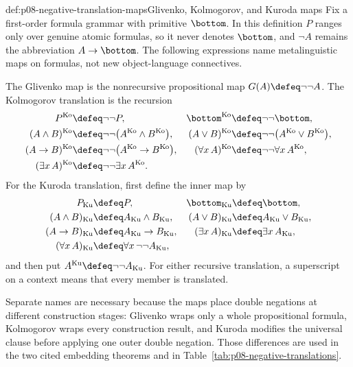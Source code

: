 \begin{hbdefinition}{def:p08-negative-translation-maps}{Glivenko, Kolmogorov, and Kuroda maps}
Fix a first-order formula grammar with primitive \(\bottom\).  In this
definition \(P\) ranges only over genuine atomic formulas, so it never denotes
\(\bottom\), and \(\neg A\) remains the abbreviation
\(A\to\bottom\).  The following expressions name metalinguistic maps on
formulas, not new object-language connectives.

The Glivenko map is the nonrecursive propositional map
\(G(A)\defeq\neg\neg A\).  The Kolmogorov translation is the recursion
\[
 \begin{aligned}
 P^{\mathrm{Ko}}&\defeq\neg\neg P,
 &\bottom^{\mathrm{Ko}}&\defeq\neg\neg\bottom,\\
 (A\land B)^{\mathrm{Ko}}&\defeq
   \neg\neg\bigl(A^{\mathrm{Ko}}\land B^{\mathrm{Ko}}\bigr),
 &(A\lor B)^{\mathrm{Ko}}&\defeq
   \neg\neg\bigl(A^{\mathrm{Ko}}\lor B^{\mathrm{Ko}}\bigr),\\
 (A\to B)^{\mathrm{Ko}}&\defeq
   \neg\neg\bigl(A^{\mathrm{Ko}}\to B^{\mathrm{Ko}}\bigr),
 &(\forall x\,A)^{\mathrm{Ko}}&\defeq
   \neg\neg\forall x\,A^{\mathrm{Ko}},\\
 (\exists x\,A)^{\mathrm{Ko}}&\defeq
   \neg\neg\exists x\,A^{\mathrm{Ko}}.
 \end{aligned}
\]
For the Kuroda translation, first define the inner map by
\[
 \begin{aligned}
 P_{\mathrm{Ku}}&\defeq P,
 &\bottom_{\mathrm{Ku}}&\defeq\bottom,\\
 (A\land B)_{\mathrm{Ku}}&\defeq A_{\mathrm{Ku}}\land B_{\mathrm{Ku}},
 &(A\lor B)_{\mathrm{Ku}}&\defeq A_{\mathrm{Ku}}\lor B_{\mathrm{Ku}},\\
 (A\to B)_{\mathrm{Ku}}&\defeq A_{\mathrm{Ku}}\to B_{\mathrm{Ku}},
 &(\exists x\,A)_{\mathrm{Ku}}&\defeq\exists x\,A_{\mathrm{Ku}},\\
 (\forall x\,A)_{\mathrm{Ku}}&\defeq
   \forall x\,\neg\neg A_{\mathrm{Ku}},
 \end{aligned}
\]
and then put \(A^{\mathrm{Ku}}\defeq\neg\neg A_{\mathrm{Ku}}\).
For either recursive translation, a superscript on a context means that every
member is translated.

Separate names are necessary because the maps place double negations at
different construction stages: Glivenko wraps only a whole propositional
formula, Kolmogorov wraps every construction result, and Kuroda modifies the
universal clause before applying one outer double negation.  Those differences
are used in the two cited embedding theorems and in
Table~\ref{tab:p08-negative-translations}.
\end{hbdefinition}

